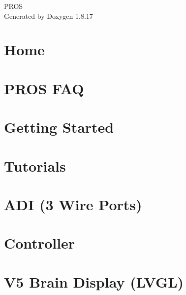 \let\mypdfximage\pdfximage\def\pdfximage{\immediate\mypdfximage}\documentclass[twoside]{book}
\newcommand{\+}{\discretionary{\mbox{\scriptsize$\hookleftarrow$}}{}{}}
\newcommand{\clearemptydoublepage}{%
  \newpage{\pagestyle{empty}\cleardoublepage}%
}
\begin{document}
\hypersetup{pageanchor=false,
             bookmarksnumbered=true,
             pdfencoding=unicode
            }
\begin{titlepage}
\vspace*{7cm}
\begin{center}%
{\Large P\+R\+OS }\\
\vspace*{1cm}
{\large Generated by Doxygen 1.8.17}\\
\end{center}
\end{titlepage}
\clearemptydoublepage
{}
\tableofcontents
\clearemptydoublepage
{}
\hypersetup{pageanchor=true}

\chapter{Home}
\label{index}\hypertarget{index}{}
\chapter{P\+R\+OS F\+AQ}
\label{md_docs_getting-started_faq}

\chapter{Getting Started}
\label{getting-started}

\chapter{Tutorials}
\label{tutorials}

\chapter{A\+DI (3 Wire Ports)}
\label{md_docs_tutorials_topical_adi}

\chapter{Controller}
\label{md_docs_tutorials_topical_controller}

\chapter{V5 Brain Display (L\+V\+GL)}
\label{md_docs_tutorials_topical_display}

\end{document}
